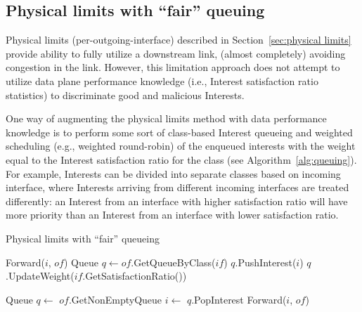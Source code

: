 \subsection{Physical limits with ``fair'' queuing}
\label{sec:queuing}

Physical limits (per-outgoing-interface) described in Section~\ref{sec:physical limits} provide ability to fully utilize a downstream link, (almost completely) avoiding congestion in the link.
However, this limitation approach does not attempt to utilize data plane performance knowledge (i.e., Interest satisfaction ratio statistics) to discriminate good and malicious Interests.

One way of augmenting the physical limits method with data performance knowledge is to perform some sort of class-based Interest queueing and weighted scheduling (e.g., weighted round-robin) of the enqueued interests with the weight equal to the Interest satisfaction ratio for the class (see Algorithm~\ref{alg:queuing}).
For example, Interests can be divided into separate classes based on incoming interface, where Interests arriving from different incoming interfaces are treated differently:
an Interest from an interface with higher satisfaction ratio will have more priority than an Interest from an interface with lower satisfaction ratio.



\begin{algorithm}[h]
\caption{Physical limits with ``fair'' queueing}
\label{alg:queuing}
\begin{algorithmic}[1]
        \State Forward($i$, $of$)
    \Else
        \State Queue $q \leftarrow of$.GetQueueByClass($if$)
        \State $q$.PushInterest($i$)
        \State $q$.UpdateWeight($if$.GetSatisfactionRatio())
    \EndIf
\EndFor
\EndFunction

\vspace{0.2cm}
\State{} 
\State{} 
\State Queue $q \leftarrow$ $of$.GetNonEmptyQueue 
\State $i \leftarrow$ $q$.PopInterest
\State Forward($i$, $of$)
\EndFunction
\end{algorithmic}
\end{algorithm}

